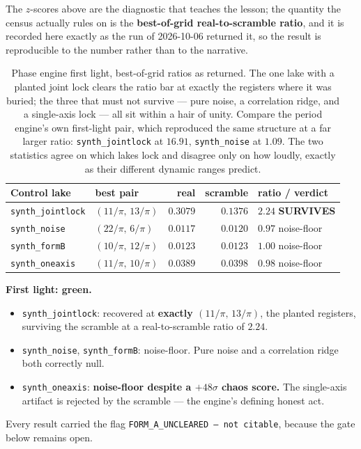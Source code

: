 \documentclass[11pt, letterpaper, openany]{book}
\begin{document}
The $z$-scores above are the diagnostic that teaches the lesson; the quantity the census
actually rules on is the \textbf{best-of-grid real-to-scramble ratio}, and it is recorded here
exactly as the run of 2026-10-06 returned it, so the result is reproducible to the number rather
than to the narrative.

\begin{table}[H]
\centering
\small
\begin{tabular}{@{}llrr l@{}}
\toprule
\textbf{Control lake} & \textbf{best pair} & \textbf{real} & \textbf{scramble} & \textbf{ratio / verdict} \\
\midrule
\texttt{synth\_jointlock} & $(11/\pi,\,13/\pi)$ & $0.3079$ & $0.1376$ & $\mathbf{2.24}$ \; \textbf{SURVIVES} \\
\texttt{synth\_noise}     & $(22/\pi,\,6/\pi)$  & $0.0117$ & $0.0120$ & $0.97$ \; noise-floor \\
\texttt{synth\_formB}     & $(10/\pi,\,12/\pi)$ & $0.0123$ & $0.0123$ & $1.00$ \; noise-floor \\
\texttt{synth\_oneaxis}   & $(11/\pi,\,10/\pi)$ & $0.0389$ & $0.0398$ & $0.98$ \; noise-floor \\
\bottomrule
\end{tabular}
\caption{Phase engine first light, best-of-grid ratios as returned. The one lake with a planted
joint lock clears the ratio bar at exactly the registers where it was buried; the three that must
not survive --- pure noise, a correlation ridge, and a single-axis lock --- all sit within a
hair of unity. Compare the period engine's own first-light pair, which reproduced the same
structure at a far larger ratio: \texttt{synth\_jointlock} at $16.91$, \texttt{synth\_noise} at
$1.09$. The two statistics agree on which lakes lock and disagree only on how loudly, exactly as
their different dynamic ranges predict.}
\end{table}

\begin{signalbox}
\textbf{First light: green.}
\begin{itemize}
    \item \texttt{synth\_jointlock}: recovered at \textbf{exactly $(11/\pi,\,13/\pi)$}, the planted
          registers, surviving the scramble at a real-to-scramble ratio of $2.24$.
    \item \texttt{synth\_noise}, \texttt{synth\_formB}: noise-floor. Pure noise and a correlation
          ridge both correctly null.
    \item \texttt{synth\_oneaxis}: \textbf{noise-floor despite a $+48\sigma$ chaos score.} The
          single-axis artifact is rejected by the scramble --- the engine's defining honest act.
\end{itemize}
Every result carried the flag \texttt{FORM\_A\_UNCLEARED --- not citable}, because the gate below
remains open.
\end{signalbox}
\end{document}
